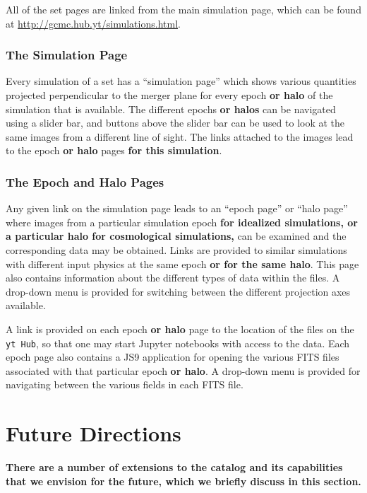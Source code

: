 \documentclass{emulateapj}
\newcommand{\code}[1]{\texttt{#1}}
\begin{document}
All of the set pages are linked from the main simulation page, which can be found at \url{http://gcmc.hub.yt/simulations.html}.

\subsubsection{The Simulation Page}\label{sec:sim_page}

Every simulation of a set has a ``simulation page'' which shows various quantities projected perpendicular to the merger plane for every epoch {\bf or halo} of the simulation that is available. The different epochs {\bf or halos} can be navigated using a slider bar, and buttons above the slider bar can be used to look at the same images from a different line of sight. The links attached to the images lead to the epoch {\bf or halo} pages {\bf for this simulation}.

\subsubsection{The Epoch and Halo Pages}\label{sec:epoch_page}

Any given link on the simulation page leads to an ``epoch page'' or ``halo page'' where images from a particular simulation epoch {\bf for idealized simulations, or a particular halo for cosmological simulations,} can be examined and the corresponding data may be obtained. Links are provided to similar simulations with different input physics at the same epoch {\bf or for the same halo}. This page also contains information about the different types of data within the files. A drop-down menu is provided for switching between the different projection axes available.

A link is provided on each epoch {\bf or halo} page to the location of the files on the \code{yt Hub}, so that one may start Jupyter notebooks with access to the data. Each epoch page also contains a JS9 application for opening the various FITS files associated with that particular epoch {\bf or halo}. A drop-down menu is provided for navigating between the various fields in each FITS file.

\section{Future Directions}\label{sec:future}

{\bf There are a number of extensions to the catalog and its capabilities that we envision for the future, which we briefly discuss in this section.}
\end{document}
